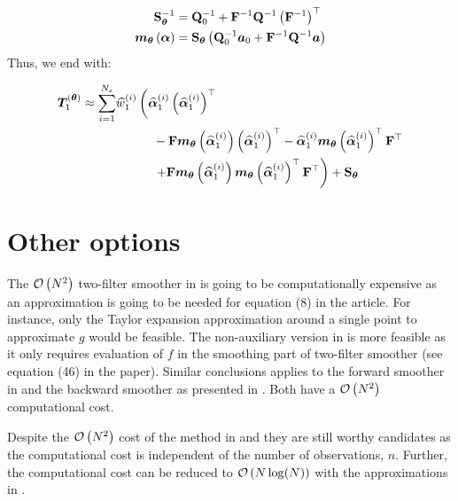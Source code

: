 \begin{equation}\begin{split}
	\mat{S}_{\vec{\theta}}^{-1} &= 
		\mat{Q}_0^{-1} + \mat{F}^{-1}\mat{Q}^{-1}\Lparen{\mat{F}^{-1}}^\top \\ 
%
	\optor{\vec{m}_{\vec{\theta}}}{\vec{\alpha}} &= 
		\mat{S}_{\vec{\theta}}
		\Lparen{\mat{Q}_0^{-1}\vec{a}_0 + \mat{F}^{-1}\mat{Q}^{-1}\vec{a}}
\end{split}\end{equation}%
%
Thus, we end with:

\begin{equation}\begin{split}
\vec{T}_1^{(\vec{\theta})} \approx  
	\sum_{i = 1}^{N_s} \hspace{30pt} & \hspace{-30pt} \particS{w}{1}{i}\left(
		\particS{\vec{\alpha}}{1}{i}\Lparen{\particS{\vec{\alpha}}{1}{i}}^\top \right. \\
%
	&  -\mat{F}\optor{\vec{m}_{\vec{\theta}}}{\particS{\vec{\alpha}}{1}{i}}
		\Lparen{\particS{\vec{\alpha}}{1}{i}}^\top
	- \particS{\vec{\alpha}}{1}{i}
		\optor{\vec{m}_{\vec{\theta}}}{\particS{\vec{\alpha}}{1}{i}}^\top\mat{F}^\top \\
%
	& \left. + \mat{F}
		\optor{\vec{m}_{\vec{\theta}}}{\particS{\vec{\alpha}}{1}{i}}
		\optor{\vec{m}_{\vec{\theta}}}{\particS{\vec{\alpha}}{1}{i}}^\top
	\mat{F}^\top \right) + \mat{S}_{\vec{\theta}} 
\end{split}\end{equation}

\section{Other options}
The $\mathcal{O}\left( N^2\right)$ two-filter smoother in \cite{fearnhead10} is going to be computationally expensive as an approximation is going to be needed for equation (8) in the article. For instance, only the Taylor expansion approximation around a single point to approximate $g$ would be feasible. The non-auxiliary version in \citet{briers10} is more feasible as it only requires evaluation of $f$ in the smoothing part of two-filter smoother (see equation (46) in the paper). Similar conclusions applies to the forward smoother in \cite{del10} and the backward smoother as presented in \cite{kantas15}. Both have a $\mathcal{O}\left( N^2\right)$ computational cost.

Despite the $\mathcal{O}\left( N^2\right)$ cost of the method in \citet{briers10} and \cite{del10} they are still worthy candidates as the computational cost is independent of the number of observations, $n$.  Further, the computational cost can be reduced to $\mathcal{O}\left( N\log(N)\right)$ with the approximations in \cite{klaas06}.

